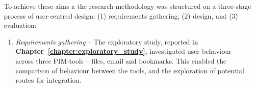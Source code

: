 \begin{enumerate}

\end{enumerate}

To achieve these aims a the research methodology was structured on a three-stage process of user-centred design: (1) requirements gathering, (2) design, and (3) evaluation:  

 
\begin{enumerate}

\item \textit{Requirements gathering} -- The exploratory study, reported in \textbf{Chapter~\ref{chapter:exploratory_study}}, investigated user behaviour across three PIM-tools -- files, email and bookmarks.  This enabled the comparison of behaviour between the tools, and the exploration of  potential routes for integration.  %


\end{enumerate}
